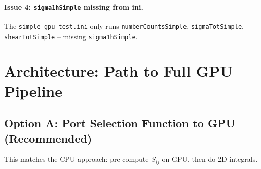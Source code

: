 \documentclass[a4paper, 11pt]{article}
\newcommand{\filepath}[1]{{\small\texttt{#1}}}
\begin{document}
\paragraph{Issue 4: \texttt{sigma1hSimple} missing from ini.}
The \filepath{simple\_gpu\_test.ini} only runs \texttt{numberCountsSimple}, \texttt{sigmaTotSimple}, \texttt{shearTotSimple} -- missing \texttt{sigma1hSimple}.

\section{Architecture: Path to Full GPU Pipeline}
\label{sec:architecture}

\subsection{Option A: Port Selection Function to GPU (Recommended)}

This matches the CPU approach: pre-compute $S_{ij}$ on GPU, then do 2D integrals.
\end{document}
